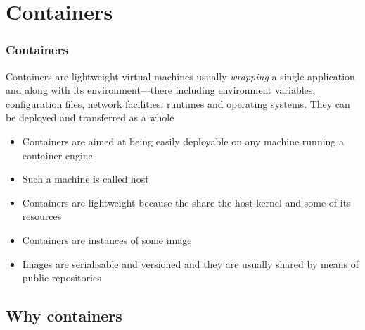 \documentclass{beamer}\mode<presentation>{\usetheme{AMSBolognaFC}}
\begin{document}
\section{Containers}

\begin{frame}
\frametitle{Containers}

    \begin{block}{}
        Containers are \alert{lightweight} virtual machines usually \emph{wrapping} a \alert{single application} and along with its \alert{environment}---there including environment variables, configuration files, network facilities, runtimes and operating systems. They can be deployed and transferred as a whole
    \end{block}
    \begin{itemize}
        \item Containers are aimed at being easily deployable on any machine running a container \alert{engine}
        \item Such a machine is called \alert{host}
        \item Containers are \alert{lightweight} because the share the host kernel and some of its resources
        \item Containers are instances of some \alert{image}
        \item Images are serialisable and versioned and they are usually shared by means of public \alert{repositories}
    \end{itemize}


\end{frame}

\subsection{Why containers}
\end{document}
